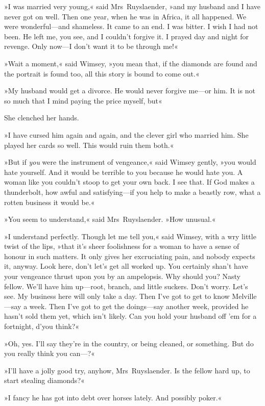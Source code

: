»I was married very young,« said Mrs~Ruyslaender, »and my husband and I have never got on well. Then one year, when he was in Africa, it all happened. We were wonderful—and shameless. It came to an end. I was bitter. I wish I had not been. He left me, you see, and I couldn't forgive it. I prayed day and night for revenge. Only now—I don't want it to be through me!«

»Wait a moment,« said Wimsey, »you mean that, if the diamonds are found and the portrait is found too, all this story is bound to come out.«

»My husband would get a divorce. He would never forgive me—or him. It is not so much that I mind paying the price myself, but\longdash«

She clenched her hands.

»I have cursed him again and again, and the clever girl who married him. She played her cards so well. This would ruin them both.«

»But if \textit{you} were the instrument of vengeance,« said Wimsey gently, »you would hate yourself. And it would be terrible to you because he would hate you. A woman like you couldn't stoop to get your own back. I see that. If God makes a thunderbolt, how awful and satisfying—if you help to make a beastly row, what a rotten business it would be.«

»You seem to understand,« said Mrs~Ruyslaender. »How unusual.«

»I understand perfectly. Though let me tell you,« said Wimsey, with a wry little twist of the lips, »that it's sheer foolishness for a woman to have a sense of honour in such matters. It only gives her excruciating pain, and nobody expects it, anyway. Look here, don't let's get all worked up. You certainly shan't have your vengeance thrust upon you by an ampelopsis. Why should you? Nasty fellow. We'll have him up—root, branch, and little suckers. Don't worry. Let's see. My business here will only take a day. Then I've got to get to know Melville—say a week. Then I've got to get the doings—say another week, provided he hasn't sold them yet, which isn't likely. Can you hold your husband off 'em for a fortnight, d'you think?«

»Oh, yes. I'll say they're in the country, or being cleaned, or something. But do you really think you can—?«

»I'll have a jolly good try, anyhow, Mrs~Ruyslaender. Is the fellow hard up, to start stealing diamonds?«

»I fancy he has got into debt over horses lately. And possibly poker.«

